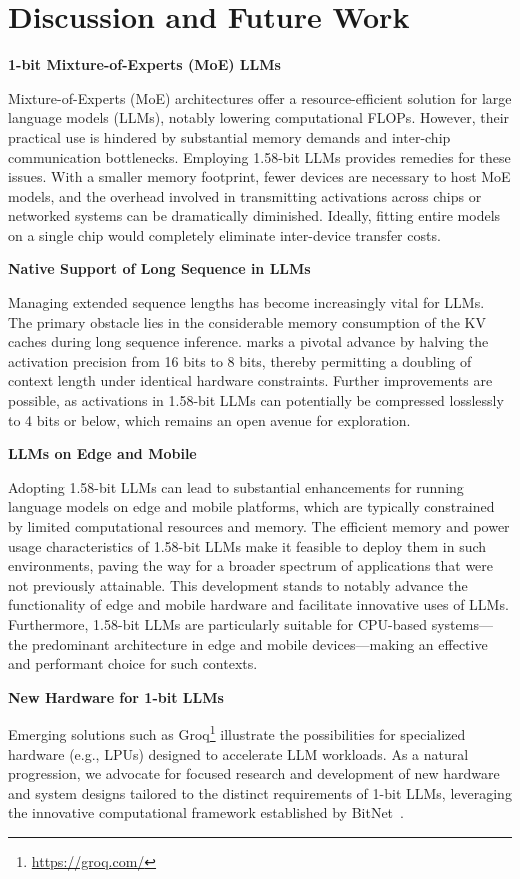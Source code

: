 \section{Discussion and Future Work}

\textbf{1-bit Mixture-of-Experts (MoE) LLMs}

Mixture-of-Experts (MoE) architectures offer a resource-efficient solution for large language models (LLMs), notably lowering computational FLOPs. However, their practical use is hindered by substantial memory demands and inter-chip communication bottlenecks. Employing 1.58-bit LLMs provides remedies for these issues. With a smaller memory footprint, fewer devices are necessary to host MoE models, and the overhead involved in transmitting activations across chips or networked systems can be dramatically diminished. Ideally, fitting entire models on a single chip would completely eliminate inter-device transfer costs.

\textbf{Native Support of Long Sequence in LLMs}

Managing extended sequence lengths has become increasingly vital for LLMs. The primary obstacle lies in the considerable memory consumption of the KV caches during long sequence inference.  marks a pivotal advance by halving the activation precision from 16 bits to 8 bits, thereby permitting a doubling of context length under identical hardware constraints. Further improvements are possible, as activations in 1.58-bit LLMs can potentially be compressed losslessly to 4 bits or below, which remains an open avenue for exploration.

\textbf{LLMs on Edge and Mobile}

Adopting 1.58-bit LLMs can lead to substantial enhancements for running language models on edge and mobile platforms, which are typically constrained by limited computational resources and memory. The efficient memory and power usage characteristics of 1.58-bit LLMs make it feasible to deploy them in such environments, paving the way for a broader spectrum of applications that were not previously attainable. This development stands to notably advance the functionality of edge and mobile hardware and facilitate innovative uses of LLMs. Furthermore, 1.58-bit LLMs are particularly suitable for CPU-based systems—the predominant architecture in edge and mobile devices—making  an effective and performant choice for such contexts.

\textbf{New Hardware for 1-bit LLMs}

Emerging solutions such as Groq\footnote{\url{https://groq.com/}} illustrate the possibilities for specialized hardware (e.g., LPUs) designed to accelerate LLM workloads. As a natural progression, we advocate for focused research and development of new hardware and system designs tailored to the distinct requirements of 1-bit LLMs, leveraging the innovative computational framework established by BitNet~\cite{bitnet}.